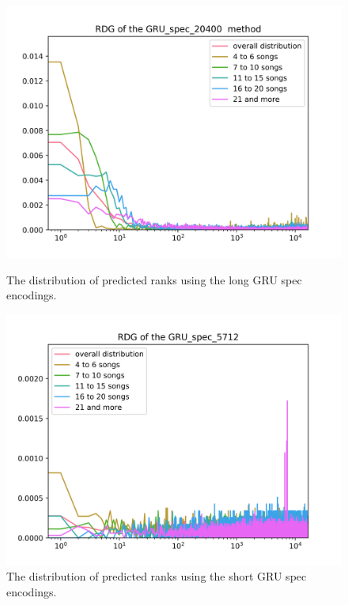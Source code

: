 \begin{figure}[hbt!]
\centering
\begin{minipage}{.5\textwidth}
  \centering
  \includegraphics[width=1\linewidth]{./img/gru_spec_20400_graph.png}
  \caption{The distribution of predicted ranks using the long GRU spec encodings.}
  \label{fig:gru_spec_20400_distribution}
\end{minipage}%
\begin{minipage}{.5\textwidth}
  \centering
  \includegraphics[width=1\linewidth]{./img/gru_spec_5712_graph.png}
  \caption{The distribution of predicted ranks using the short GRU spec encodings.}
  \label{fig:gru_spec_5712_distribution}
\end{minipage}
\end{figure}\label{fig:gru_spec_distributions}

